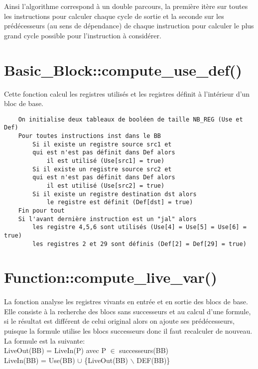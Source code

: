 \documentclass[a4paper,12pt]{report}
\begin{document}
Ainsi l'algorithme correspond à un double parcours, la première itère sur toutes les instructions pour calculer chaque cycle de sortie et la seconde sur les prédécesseurs (au sens de dépendance) de chaque instruction pour calculer le plus grand cycle possible pour l'instruction à considérer.

\section{Basic\_Block::compute\_use\_def()}
Cette fonction calcul les registres utilisés et les registres définit à l'intérieur d'un bloc de base.

\begin{verbatim}
    On initialise deux tableaux de booléen de taille NB_REG (Use et Def)
    Pour toutes instructions inst dans le BB
        Si il existe un registre source src1 et 
        qui est n'est pas définit dans Def alors
            il est utilisé (Use[src1] = true)
        Si il existe un registre source src2 et 
        qui est n'est pas définit dans Def alors
            il est utilisé (Use[src2] = true)
        Si il existe un registre destination dst alors
            le registre est définit (Def[dst] = true)
    Fin pour tout
    Si l'avant dernière instruction est un "jal" alors
        les registre 4,5,6 sont utilisés (Use[4] = Use[5] = Use[6] = true)
        les registres 2 et 29 sont définis (Def[2] = Def[29] = true)
\end{verbatim}

\section{Function::compute\_live\_var()}
\paragraph*{}
La fonction analyse les registres vivants en entrée et en sortie des blocs de base.
Elle consiste à la recherche des blocs sans successeurs et au calcul d'une formule, si le résultat est différent de celui original alors on ajoute ses prédécesseurs, puisque la formule utilise les blocs successeurs donc il faut recalculer de nouveau.\\
La formule est la suivante:\\
    LiveOut(BB) = LiveIn(P)  avec P $\in$ successeurs(BB) \\
    LiveIn(BB) = Use(BB) $\cup$ \{LiveOut(BB) $\backslash$ DEF(BB)\}
\end{document}
